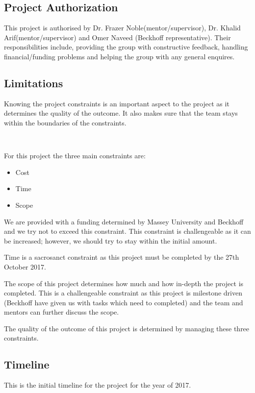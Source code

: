 \documentclass[a4paper, 10pt, conference]{IEEEconf}
\begin{document}
\subsection{Project Authorization}
This project is authorised by Dr. Frazer Noble(mentor/supervisor), Dr. Khalid Arif(mentor/supervisor) and Omer Naveed (Beckhoff representative). Their responsibilities include, providing the group with constructive feedback, handling financial/funding problems and helping the group with any general enquires. 

\subsection{Limitations}
Knowing the project constraints is an important aspect to the project as it determines the quality of the outcome. It also makes sure that the team stays within the boundaries of the constraints.

\
\
\
\
\
\

For this project the three main constraints are:

\begin{itemize}
	\item Cost
	\item Time
	\item Scope
\end{itemize}	

We are provided with a funding determined by Massey University and Beckhoff and we try not to exceed this constraint. This constraint is challengeable as it can be increased; however, we should try to stay within the initial amount.

Time is a sacrosanct constraint as this project must be completed by the 27th October 2017.

The scope of this project determines how much and how in-depth the project is completed. This is a challengeable constraint as this project is milestone driven (Beckhoff have given us with tasks which need to completed) and the team and mentors can further discuss the scope.

The quality of the outcome of this project is determined by managing these three constraints.

\subsection{Timeline}
This is the initial timeline for the project for the year of 2017.
\end{document}
